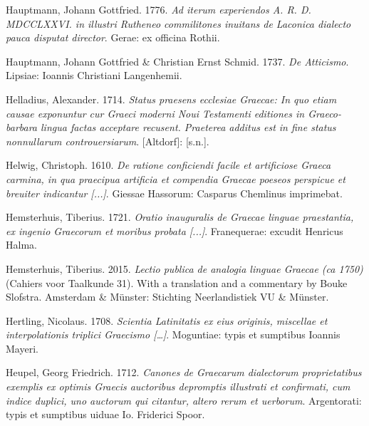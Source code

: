 \begin{styleStandard}
Hauptmann, Johann Gottfried. 1776. \textit{Ad iterum experiendos A. R. D. MDCCLXXVI. in illustri Rutheneo commilitones inuitans de Laconica dialecto pauca disputat director}. Gerae: ex officina Rothii.
\end{styleStandard}

\begin{styleStandard}
Hauptmann, Johann Gottfried \& Christian Ernst Schmid. 1737. \textit{De Atticismo}. Lipsiae: Ioannis Christiani Langenhemii.
\end{styleStandard}

\begin{styleStandard}
Helladius, Alexander. 1714. \textit{Status praesens ecclesiae Graecae: In quo etiam causae exponuntur cur Graeci moderni Noui Testamenti editiones in Graeco-barbara lingua factas acceptare recusent. Praeterea additus est in fine status nonnullarum controuersiarum}. [Altdorf]: [s.n.].
\end{styleStandard}

\begin{styleStandard}
Helwig, Christoph. 1610. \textit{De ratione conficiendi facile et artificiose Graeca carmina, in qua praecipua artificia et compendia Graecae poeseos perspicue et breuiter indicantur [...]}. Giessae Hassorum: Casparus Chemlinus imprimebat.
\end{styleStandard}

\begin{styleStandard}
Hemsterhuis, Tiberius. 1721. \textit{Oratio inauguralis de Graecae linguae praestantia, ex ingenio Graecorum et moribus probata [...]}. Franequerae: excudit Henricus Halma.
\end{styleStandard}

\begin{styleStandard}
Hemsterhuis, Tiberius. 2015. \textit{Lectio publica de analogia linguae Graecae (ca 1750)} (Cahiers voor Taalkunde 31). With a translation and a commentary by Bouke Slofstra. Amsterdam \& Münster: Stichting Neerlandistiek VU \& Münster.
\end{styleStandard}

\begin{styleStandard}
Hertling, Nicolaus. 1708. \textit{Scientia Latinitatis ex eius originis, miscellae et interpolationis triplici Graecismo […]}. Moguntiae: typis et sumptibus Ioannis Mayeri.
\end{styleStandard}

\begin{styleStandard}
Heupel, Georg Friedrich. 1712. \textit{Canones de Graecarum dialectorum proprietatibus exemplis ex optimis Graecis auctoribus depromptis illustrati et confirmati, cum indice duplici, uno auctorum qui citantur, altero rerum et uerborum}. Argentorati: typis et sumptibus uiduae Io. Friderici Spoor.
\end{styleStandard}

